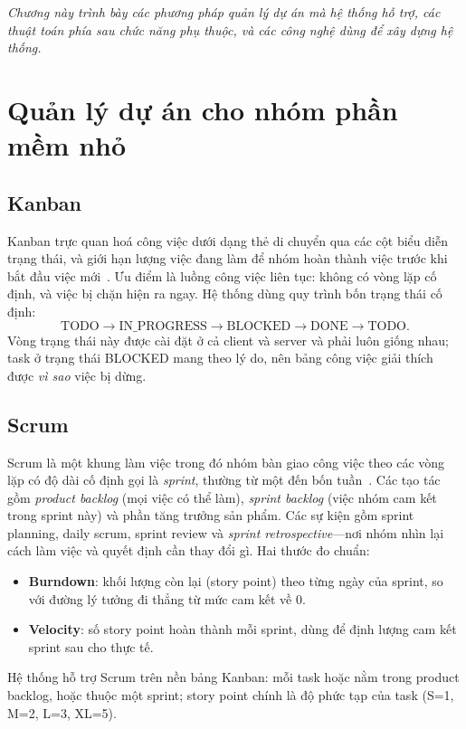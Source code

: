 \documentclass[../main.tex]{subfiles}
\begin{document}
\textit{Chương này trình bày các phương pháp quản lý dự án mà hệ thống hỗ trợ, các thuật toán phía
sau chức năng phụ thuộc, và các công nghệ dùng để xây dựng hệ thống.}

\section{Quản lý dự án cho nhóm phần mềm nhỏ}
\subsection{Kanban}
Kanban trực quan hoá công việc dưới dạng thẻ di chuyển qua các cột biểu diễn trạng thái, và giới hạn
lượng việc đang làm để nhóm hoàn thành việc trước khi bắt đầu việc mới~\cite{anderson2010kanban}.
Ưu điểm là luồng công việc liên tục: không có vòng lặp cố định, và việc bị chặn hiện ra ngay. Hệ thống
dùng quy trình bốn trạng thái cố định:
\[
\text{TODO} \rightarrow \text{IN\_PROGRESS} \rightarrow \text{BLOCKED} \rightarrow \text{DONE} \rightarrow \text{TODO}.
\]
Vòng trạng thái này được cài đặt ở cả client và server và phải luôn giống nhau; task ở trạng thái
BLOCKED mang theo lý do, nên bảng công việc giải thích được \emph{vì sao} việc bị dừng.

\subsection{Scrum}
Scrum là một khung làm việc trong đó nhóm bàn giao công việc theo các vòng lặp có độ dài cố định gọi
là \emph{sprint}, thường từ một đến bốn tuần~\cite{schwaber2020scrum}. Các tạo tác gồm \emph{product
backlog} (mọi việc có thể làm), \emph{sprint backlog} (việc nhóm cam kết trong sprint này) và phần
tăng trưởng sản phẩm. Các sự kiện gồm sprint planning, daily scrum, sprint review và \emph{sprint
retrospective}---nơi nhóm nhìn lại cách làm việc và quyết định cần thay đổi gì. Hai thước đo chuẩn:
\begin{itemize}
  \item \textbf{Burndown}: khối lượng còn lại (story point) theo từng ngày của sprint, so với đường
        lý tưởng đi thẳng từ mức cam kết về 0.
  \item \textbf{Velocity}: số story point hoàn thành mỗi sprint, dùng để định lượng cam kết sprint
        sau cho thực tế.
\end{itemize}
Hệ thống hỗ trợ Scrum trên nền bảng Kanban: mỗi task hoặc nằm trong product backlog, hoặc thuộc một
sprint; story point chính là độ phức tạp của task (S=1, M=2, L=3, XL=5).
\end{document}
